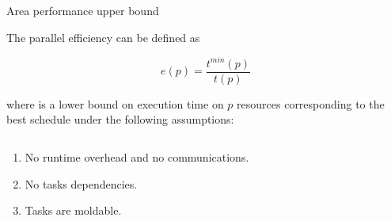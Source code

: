 \begin{frame}{Area performance upper bound}

  The parallel efficiency can be defined as

  \begin{displaymath}
    e(p) = \frac{t^{min}(p)}{t(p)}
  \end{displaymath}

  where  is a lower bound on execution time on $p$
  resources corresponding to the \alert{best schedule} under the
  following assumptions:

  \begin{columns}
    \begin{column}{0.45\textwidth}

      \begin{enumerate}
      \item<2-> No runtime overhead and no communications.
      \item<3-> No tasks dependencies.
      \item<4-> Tasks are moldable.

      \end{enumerate}

    \end{column}
    \begin{column}{0.55\textwidth}


\end{column}
\end{columns}
\end{frame}
